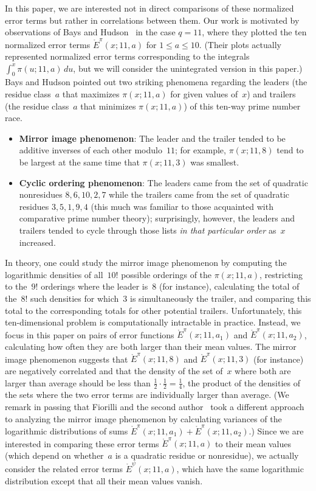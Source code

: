 \documentclass[11pt]{article}
\theoremstyle{plain}
\theoremstyle{definition}
\numberwithin{equation}{section}
\newcommand{\Edot}{\mathord{\mathring E}}
\newcommand{\0}{{\vec 0}}
\begin{document}
In this paper, we are interested not in direct comparisons of these normalized error terms but rather in correlations between them. Our work is motivated by observations of Bays and Hudson~\cite{BaysHudson} in the case $q=11$, where they plotted the ten normalized error terms $\Edot^\pi(x;11,a)$ for $1\le a\le 10$. (Their plots actually represented normalized error terms corresponding to the integrals $\int_0^{x}\pi(u;11,a)\,du$, but we will consider the unintegrated version in this paper.) Bays and Hudson pointed out two striking phenomena regarding the leaders (the residue class~$a$ that maximizes $\pi(x;11,a)$ for given values of~$x$) and trailers (the residue class~$a$ that minimizes $\pi(x;11,a)$) of this ten-way prime number race.
\begin{itemize}\setlength\itemsep{0pt}
\item {\bf Mirror image phenomenon}: The leader and the trailer tended to be additive inverses of each other modulo~$11$; for example, $\pi(x;11,8)$ tend to be largest at the same time that $\pi(x;11,3)$ was smallest.
\item {\bf Cyclic ordering phenomenon}: The leaders came from the set of quadratic nonresidues $8,6,10,2,7$ while the trailers came from the set of quadratic residues $3,5,1,9,4$ (this much was familiar to those acquainted with comparative prime number theory); surprisingly, however, the leaders and trailers tended to cycle through those lists {\em in that particular order} as~$x$ increased.
\end{itemize}

In theory, one could study the mirror image phenomenon by computing the logarithmic densities of all~$10!$ possible orderings of the $\pi(x;11,a)$, restricting to the~$9!$ orderings where the leader is~$8$ (for instance), calculating the total of the~$8!$ such densities for which~$3$ is simultaneously the trailer, and comparing this total to the corresponding totals for other potential trailers. Unfortunately, this ten-dimensional problem is computationally intractable in practice. Instead, we focus in this paper on pairs of error functions $\Edot^\pi(x;11,a_1)$ and $\Edot^\pi(x;11,a_2)$, calculating how often they are both larger than their mean values. The mirror image phenomenon suggests that $\Edot^\pi(x;11,8)$ and $\Edot^\pi(x;11,3)$ (for instance) are negatively correlated and that the density of the set of~$x$ where both are larger than average should be less than $\frac12\cdot\frac12=\frac14$, the product of the densities of the sets where the two error terms are individually larger than average. (We remark in passing that Fiorilli and the second author~\cite[Section~4.3]{BSRPNR} took a different approach to analyzing the mirror image phenomenon by calculating variances of the logarithmic distributions of sums $\Edot^\pi(x;11,a_1) + \Edot^\pi(x;11,a_2)$.) Since we are interested in comparing these error terms $\Edot^\pi(x;11,a)$ to their mean values (which depend on whether~$a$ is a quadratic residue or nonresidue), we actually consider the related error terms $\Edot^\psi(x;11,a)$, which have the same logarithmic distribution except that all their mean values vanish.
\end{document}
